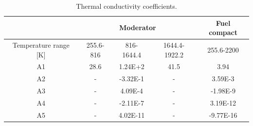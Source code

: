 \begin{table}[htbp!]
\centering
  \caption{Thermal conductivity coefficients.}
  \label{tab:th-val-assem-mat} 
  \begin{tabular}{c|ccc|c}
\toprule
                          & \multicolumn{3}{c|}{Moderator}         & Fuel compact \\ \hline
Temperature range {[}K{]} & 255.6-816 & 816-1644.4 & 1644.4-1922.2 & 255.6-2200   \\
\midrule
A1                        & 28.6      & 1.24E+2    & 41.5          & 3.94         \\
A2                        & -         & -3.32E-1   & -             & 3.59E-3      \\
A3                        & -         & 4.09E-4    & -             & -1.98E-9     \\
A4                        & -         & -2.11E-7   & -             & 3.19E-12     \\
A5                        & -         & 4.02E-11   & -             & -9.77E-16    \\
\bottomrule
  \end{tabular}
\end{table}


\begin{figure}[htbp!]
  \centering
  \hfill
  \label{fig:th-val-assem-model}
\end{figure}

